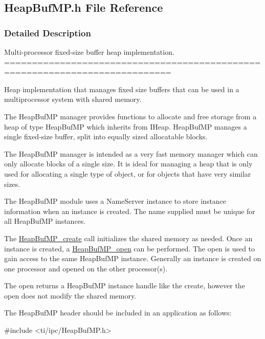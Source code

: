 \subsection{HeapBufMP.h File Reference}
\label{_heap_buf_m_p_8h}


\subsubsection{Detailed Description}
Multi-\/processor fixed-\/size buffer heap implementation. ============================================================================

Heap implementation that manages fixed size buffers that can be used in a multiprocessor system with shared memory.

The HeapBufMP manager provides functions to allocate and free storage from a heap of type HeapBufMP which inherits from IHeap. HeapBufMP manages a single fixed-\/size buffer, split into equally sized allocatable blocks.

The HeapBufMP manager is intended as a very fast memory manager which can only allocate blocks of a single size. It is ideal for managing a heap that is only used for allocating a single type of object, or for objects that have very similar sizes.

The HeapBufMP module uses a NameServer instance to store instance information when an instance is created. The name supplied must be unique for all HeapBufMP instances.

The \hyperlink{_heap_buf_m_p_8h_a3bb1b659403d9944bc4b64596b20f1f3}{HeapBufMP\_\-create} call initializes the shared memory as needed. Once an instance is created, a \hyperlink{_heap_buf_m_p_8h_a826facae0861c09d545f18dd503f0f0f}{HeapBufMP\_\-open} can be performed. The open is used to gain access to the same HeapBufMP instance. Generally an instance is created on one processor and opened on the other processor(s).

The open returns a HeapBufMP instance handle like the create, however the open does not modify the shared memory.

The HeapBufMP header should be included in an application as follows: 
\begin{DoxyCode}
  #include <ti/ipc/HeapBufMP.h>
\end{DoxyCode}


